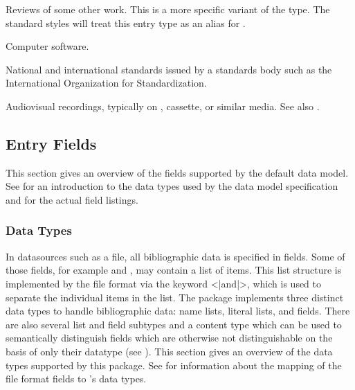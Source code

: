 \documentclass{ltxdockit}[2011/03/25]
\newcommand*{\biblatex}{\sty{biblatex}\xspace}
\begin{document}
\begin{typelist}

Reviews of some other work. This is a more specific variant of the  type. The standard styles will treat this entry type as an alias for .


Computer software.


National and international standards issued by a standards body such as the International Organization for Standardization.


Audiovisual recordings, typically on ,  cassette, or similar media. See also .

\end{typelist}

\subsection{Entry Fields}
\label{bib:fld}

This section gives an overview of the fields supported by the \biblatex default data model. See  for an introduction to the data types used by the data model specification and  for the actual field listings.

\subsubsection{Data Types}
\label{bib:fld:typ}

In datasources such as a  file, all bibliographic data is specified in fields. Some of those fields, for example  and , may contain a list of items. This list structure is implemented by the \bibtex file format via the keyword <|and|>, which is used to separate the individual items in the list. The \biblatex package implements three distinct data types to handle bibliographic data: name lists, literal lists, and fields. There are also several list and field subtypes and a content type which can be used to semantically distinguish fields which are otherwise not distinguishable on the basis of only their datatype (see ). This section gives an overview of the data types supported by this package. See  for information about the mapping of the \bibtex file format fields to \biblatex's data types.
\end{document}
